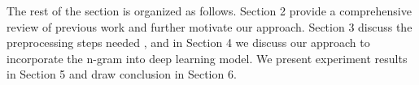 The rest of the section is organized as follows. Section 2 provide a comprehensive review of previous work and further motivate our approach. Section 3 discuss the preprocessing steps needed , and in Section 4 we discuss our approach to incorporate the n-gram into deep learning model. We present experiment results in Section 5 and draw conclusion in Section 6.
